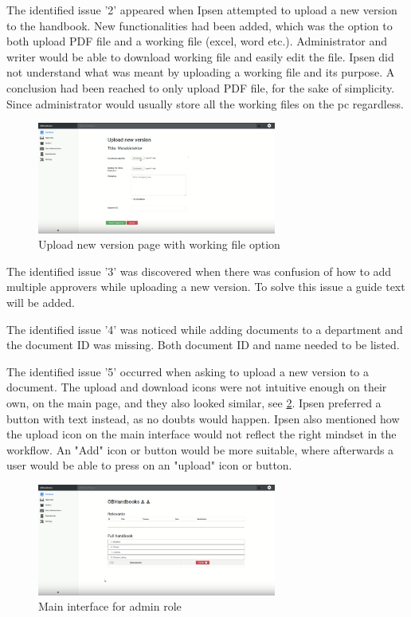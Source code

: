 \documentclass[../../master.tex]{subfiles}
\begin{document}
The identified issue '2' appeared when Ipsen attempted to upload a new version to the handbook.
New functionalities had been added, which was the option to both upload PDF file and a working file (excel, word etc.).
Administrator and writer would be able to download working file and easily edit the file.
Ipsen did not understand what was meant by uploading a working file and its purpose.
A conclusion had been reached to only upload PDF file, for the sake of simplicity.
Since administrator would usually store all the working files on the pc regardless.

\begin{figure}[H]
	\centering
		\includegraphics[width=0.7\textwidth]{billeder/WorkingFile.png}
	\caption{Upload new version page with working file option}\label{fig:WorkingFile}
\end{figure}

The identified issue '3' was discovered when there was confusion of how to add multiple approvers while uploading a new version.
To solve this issue a guide text will be added.

The identified issue '4' was noticed while adding documents to a department and the document ID was missing.
Both document ID and name needed to be listed.

The identified issue '5' occurred when asking to upload a new version to a document.
The upload and download icons were not intuitive enough on their own, on the main page, and they also looked similar, see \cref{fig:MainInterfaceAdmin}.
Ipsen preferred a button with text instead, as no doubts would happen.
Ipsen also mentioned how the upload icon on the main interface would not reflect the right mindset in the workflow.
An "Add" icon or button would be more suitable, where afterwards a user would be able to press on an "upload" icon or button.

\begin{figure}[H]
	\centering
		\includegraphics[width=0.7\textwidth]{billeder/MainInterfaceAdmin.png}
	\caption{Main interface for admin role}\label{fig:MainInterfaceAdmin}
\end{figure}
\end{document}
